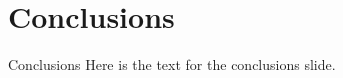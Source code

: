 \section{Conclusions}
\begin{frame}{Conclusions}
Here is the text for the conclusions slide.
\end{frame}

